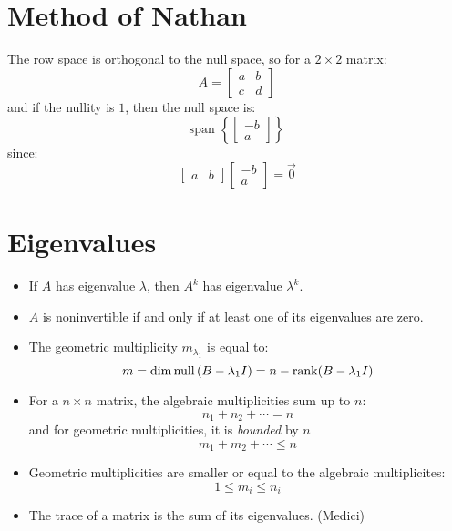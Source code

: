 \documentclass{article}
\begin{document}
    \section{Method of Nathan}
    The row space is orthogonal to the null space, so for a $2\times 2$ matrix:
    \begin{equation}
        A = \begin{bmatrix}
            a & b \\ 
            c &d
        \end{bmatrix}
    \end{equation}
    and if the nullity is $1$, then the null space is:
    \begin{equation}
        \text{span } \left\{\begin{bmatrix}
            -b \\ a
        \end{bmatrix}\right\}
    \end{equation}
    since:
    \begin{equation}
        \begin{bmatrix}
            a & b
        \end{bmatrix}\begin{bmatrix}
            -b \\ a
        \end{bmatrix} = \vec{0}
    \end{equation}
    \section{Eigenvalues}
    \begin{itemize}
        \item If $A$ has eigenvalue $\lambda$, then $A^k$ has eigenvalue $\lambda^k$.
        \item $A$ is noninvertible if and only if at least one of its eigenvalues are zero. 
        \item The geometric multiplicity $m_{\lambda_1}$ is equal to:
        \begin{equation}
            m = \dim\mathrm{null}\,(B-\lambda_1I) = n- \rank(B-\lambda_1 I)
        \end{equation}
        \item For a $n\times n$ matrix, the algebraic multiplicities sum up to $n$:
        \begin{equation}
            n_1+n_2+\cdots = n
        \end{equation}
        and for geometric multiplicities, it is \textit{bounded} by $n$
        \begin{equation}
            m_1+m_2+\cdots \le n
        \end{equation}
        \item Geometric multiplicities are smaller or equal to the algebraic multiplicites:
        \begin{equation}
            1 \le m_i \le n_i
        \end{equation}
        \item The trace of a matrix is the sum of its eigenvalues. (Medici)
    \end{itemize}
\end{document}
